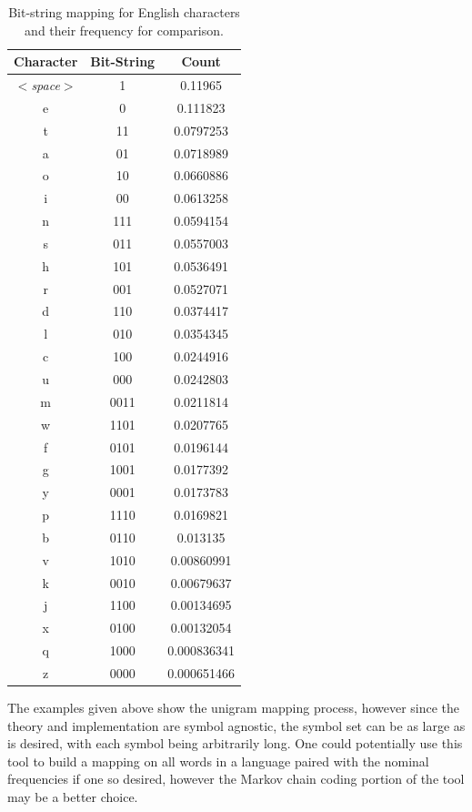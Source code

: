 \documentclass[12pt]{report}
\theoremstyle{remark}
\theoremstyle{definition}
\theoremstyle{definition}
\theoremstyle{definition}
\begin{document}
\begin{appendices}
\begin{table}
\centering
\begin{tabular}{ c | c | c }
Character&Bit-String&Count\\
\hline
$<$\emph{space}$>$&1          &0.11965   \\
e&0    &0.111823  \\
t&11    &0.0797253\\
a&01    &0.0718989\\
o&10    &0.0660886\\
i&00    &0.0613258\\
n&111    &0.0594154\\
s&011    &0.0557003\\
h&101    &0.0536491\\
r&001    &0.0527071\\
d&110    &0.0374417\\
l&010    &0.0354345\\
c&100    &0.0244916\\
u&000    &0.0242803\\
m&0011    &0.0211814\\
w&1101    &0.0207765\\
f&0101    &0.0196144\\
g&1001    &0.0177392\\
y&0001    &0.0173783\\
p&1110    &0.0169821\\
b&0110    &0.013135\\
v&1010    &0.00860991\\
k&0010    &0.00679637\\
j&1100    &0.00134695\\
x&0100    &0.00132054\\
q&1000    &0.000836341\\
z&0000    &0.000651466\\
\end{tabular}
\caption[English character bit-string mapping]{Bit-string mapping for English characters and their frequency for comparison.}
\label{TABLE_unigrammapping}
\end{table}

The examples given above show the unigram mapping process, however since the
theory and implementation are symbol agnostic, the symbol set can be as large as
is desired, with each symbol being arbitrarily long. One could potentially use
this tool to build a mapping on all words in a language paired with the nominal
frequencies if one so desired, however the Markov chain coding portion of the
tool may be a better choice.


\end{appendices}
\end{document}
